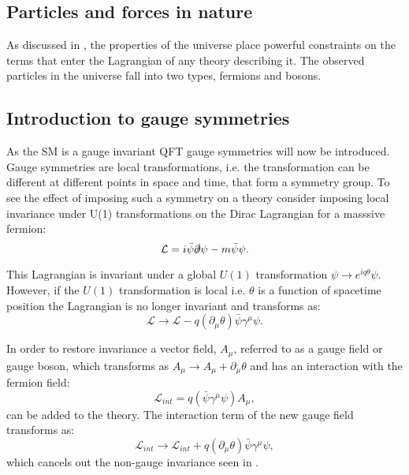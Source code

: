 \subsection{Particles and forces in nature}
\label{sec:symmetriesandfields}
As discussed in , the properties of the universe place powerful constraints on the terms that enter the Lagrangian of any theory describing it. The observed particles in the universe fall into two types, fermions and bosons.


\subsection{Introduction to gauge symmetries}
\label{sec:gaugesym}
As the SM is a gauge invariant QFT gauge symmetries will now be introduced. Gauge symmetries are local transformations, i.e. the transformation can be different at different points in space and time, that form a symmetry group. To see the effect of imposing such a symmetry on a theory consider imposing local invariance under U(1) transformations on the Dirac Lagrangian for a masssive fermion:
\begin{equation}
  \label{eq:globaldiraclagrangian}
  \mathcal{L}=i\bar{\psi}\slashed{\partial}\psi-m\bar{\psi}\psi.
\end{equation}

This Lagrangian is invariant under a global $U(1)$ transformation $\psi\rightarrow e^{iq\theta}\psi$. However, if the $U(1)$ transformation is local i.e. $\theta$ is a function of spacetime position the Lagrangian is no longer invariant and transforms as:
\begin{equation}
  \label{eq:gaugeviolating}
  \mathcal{L}\rightarrow\mathcal{L}-q(\partial_{\mu}\theta)\bar{\psi}\gamma^{\mu}\psi.
\end{equation}

In order to restore invariance a vector field, $A_{\mu}$, referred to as a gauge field or gauge boson, which transforms as $A_{\mu}\rightarrow A_{\mu}+\partial_{\mu}\theta$ and has an interaction with the fermion field:
\begin{equation}
  \mathcal{L}_{int}=q(\bar{\psi}\gamma^{\mu}\psi) A_{\mu},
\end{equation}
 can be added to the theory. The interaction term of the new gauge field transforms as:
\begin{equation}
  \mathcal{L}_{int}\rightarrow \mathcal{L}_{int}+q(\partial_{\mu}\theta)\bar{\psi}\gamma^{\mu}\psi,
\end{equation}
which cancels out the non-gauge invariance seen in .

